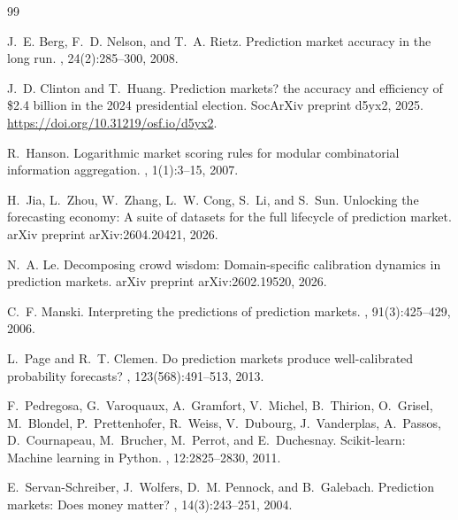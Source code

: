 \documentclass{article}
\begin{document}



\begin{thebibliography}{99}

J.~E. Berg, F.~D. Nelson, and T.~A. Rietz.
\newblock Prediction market accuracy in the long run.
, 24(2):285--300, 2008.

J.~D. Clinton and T.~Huang.
\newblock Prediction markets? the accuracy and efficiency of \$2.4 billion in
  the 2024 presidential election.
\newblock SocArXiv preprint d5yx2, 2025.
\newblock \url{https://doi.org/10.31219/osf.io/d5yx2}.

R.~Hanson.
\newblock Logarithmic market scoring rules for modular combinatorial
  information aggregation.
, 1(1):3--15, 2007.

H.~Jia, L.~Zhou, W.~Zhang, L.~W. Cong, S.~Li, and S.~Sun.
\newblock Unlocking the forecasting economy: A suite of datasets for the full
  lifecycle of prediction market.
\newblock arXiv preprint arXiv:2604.20421, 2026.

N.~A. Le.
\newblock Decomposing crowd wisdom: Domain-specific calibration dynamics in
  prediction markets.
\newblock arXiv preprint arXiv:2602.19520, 2026.

C.~F. Manski.
\newblock Interpreting the predictions of prediction markets.
, 91(3):425--429, 2006.

L.~Page and R.~T. Clemen.
\newblock Do prediction markets produce well-calibrated probability forecasts?
, 123(568):491--513, 2013.

F.~Pedregosa, G.~Varoquaux, A.~Gramfort, V.~Michel, B.~Thirion, O.~Grisel,
  M.~Blondel, P.~Prettenhofer, R.~Weiss, V.~Dubourg, J.~Vanderplas, A.~Passos,
  D.~Cournapeau, M.~Brucher, M.~Perrot, and E.~Duchesnay.
\newblock Scikit-learn: Machine learning in {P}ython.
, 12:2825--2830, 2011.

E.~Servan-Schreiber, J.~Wolfers, D.~M. Pennock, and B.~Galebach.
\newblock Prediction markets: Does money matter?
, 14(3):243--251, 2004.


\end{thebibliography}
\end{document}

